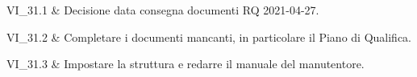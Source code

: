 VI\_31.1 & Decisione data consegna documenti RQ 2021-04-27.

\tabularnewline

VI\_31.2 & Completare i documenti mancanti, in particolare il Piano di Qualifica.

\tabularnewline

VI\_31.3 & Impostare la struttura e redarre il manuale del manutentore.

